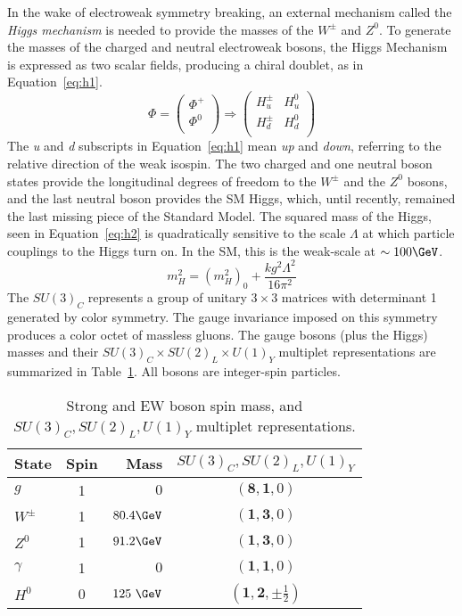 In the wake of electroweak symmetry breaking, an external mechanism called the \textit{Higgs mechanism} is needed to provide the masses of the $W^\pm$ and $Z^0$.  To generate the masses of the charged and neutral electroweak bosons, the Higgs Mechanism is expressed as two scalar fields, producing a chiral doublet, as in Equation~\ref{eq:h1}.
\begin{equation}
\Phi= \begin{pmatrix}
\Phi^+ \\
\Phi^0 \\
\end{pmatrix} \Rightarrow
\begin{pmatrix}
H^\pm_u & H^0_u \\
H^\pm_d & H^0_d  \\
\end{pmatrix}
\label{eq:h1}
\end{equation}
The \textit{u} and \textit{d} subscripts in Equation~\ref{eq:h1} mean \textit{up} and \textit{down}, referring to the relative direction of the weak isospin.  The two charged and one neutral boson states provide the longitudinal degrees of freedom to the $W^\pm$ and the $Z^0$ bosons, and the last neutral boson provides the SM Higgs, which, until recently, remained the last missing piece of the Standard Model.  The squared mass of the Higgs, seen in Equation~\ref{eq:h2} is quadratically sensitive to the scale $\Lambda$ at which particle couplings to the Higgs turn on.  In the SM, this is the weak-scale at $\sim 100\GeV$.
 \begin{equation}
 m_H^2 = (m_H^2)_0+\frac{kg^2\Lambda^2}{16\pi^2}
 \label{eq:h2}
 \end{equation}
The $SU(3)_C$ represents a group of unitary $3\times3$ matrices with determinant 1 generated by color symmetry.  The gauge invariance imposed on this symmetry produces a color octet of massless gluons.  The gauge bosons (plus the Higgs) masses and their $SU(3)_{C} \times SU(2)_{L} \times U(1)_{Y}$ multiplet representations are summarized in Table~\ref{tab:boson}.  All bosons are integer-spin particles.      
\begin{table}[!htb]
\centering
\small
\begin{tabular}{|lcrc|}
\hline
State  & Spin & Mass &  $SU(3)_{C}, SU(2)_{L}, U(1)_{Y}$ \\
\hline \hline
$g$ & 1&  $0$ & $(\mathbf{8}, \mathbf{1}, 0)$ \\ 
\hline
$W^\pm$ & 1 & $80.4\GeV$ & $(\mathbf{1}, \mathbf{3}, 0)$  \\  
$Z^0$ & 1 & $91.2\GeV$ & $(\mathbf{1}, \mathbf{3}, 0)$\\ 
$\gamma$ & 1 & $0$ & $(\mathbf{1}, \mathbf{1}, 0)$ \\  
\hline
$H^0$& 0 & $125~\GeV$&$(\mathbf{1}, \mathbf{2}, \pm\frac{1}{2})$\\
\hline 

\hline
\end{tabular}
\caption{Strong and EW boson spin mass, and $SU(3)_{C}, SU(2)_{L}, U(1)_{Y}$ multiplet representations. }
\label{tab:boson}
\end{table} 

